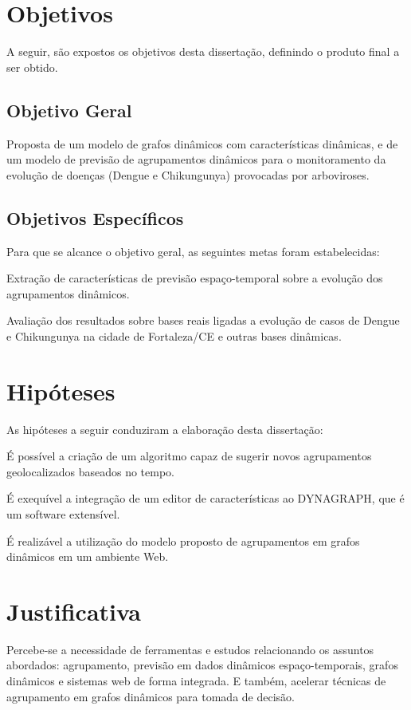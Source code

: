 \section{Objetivos}
\label{sec:objetivos}
A seguir, são expostos os objetivos desta dissertação, definindo o produto
final a ser obtido.

\subsection{Objetivo Geral}

Proposta de um modelo de grafos dinâmicos com características dinâmicas, e de um modelo de previsão de agrupamentos dinâmicos para o monitoramento da evolução de doenças (Dengue e Chikungunya) provocadas por arboviroses.

\subsection{Objetivos Específicos}
\label{sec:objetivos-especificos}

Para que se alcance o objetivo geral, as seguintes metas foram estabelecidas:

\begin{alineas}
	\item Extração de características de previsão espaço-temporal sobre a evolução dos agrupamentos dinâmicos.
	\item Avaliação dos resultados sobre bases reais ligadas a evolução de casos de Dengue e Chikungunya na cidade de Fortaleza/CE e outras bases dinâmicas.
\end{alineas}

\section{Hipóteses}
As hipóteses a seguir conduziram a elaboração desta dissertação:
\begin{alineas}
	\item É possível a criação de um algoritmo capaz de sugerir novos agrupamentos geolocalizados baseados no tempo.
	\item É exequível a integração de um editor de características ao DYNAGRAPH, que é um software extensível.
	\item É realizável a utilização do modelo proposto de agrupamentos em grafos dinâmicos em um ambiente Web.
\end{alineas}

\section{Justificativa}
Percebe-se a necessidade de ferramentas e estudos 
relacionando os assuntos abordados: agrupamento, previsão em dados
dinâmicos espaço-temporais, grafos dinâmicos e sistemas web de forma integrada.
E também, acelerar técnicas de agrupamento em grafos dinâmicos para tomada de decisão.

